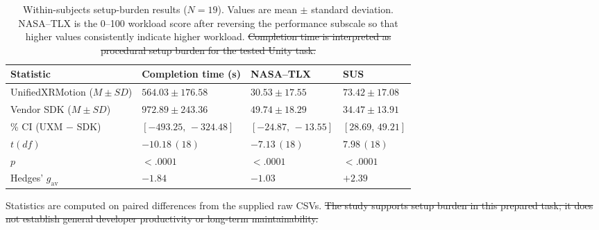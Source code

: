 \documentclass[runningheads]{llncs}
\newcommand{\rdel}[1]{\textcolor{revdel}{\sout{#1}}}
\newcommand{\rdel}[1]{}
\begin{document}
\begin{table}[t]
	\caption{Within-subjects setup-burden results ($N=19$). Values are mean $\pm$ standard deviation. NASA--TLX is the 0--100 workload score after reversing the performance subscale so that higher values consistently indicate higher workload. \protect\rdel{Completion time is interpreted as procedural setup burden for the tested Unity task.}}
	\label{tab:user-results}
	\centering
	\scriptsize
	\setlength{\tabcolsep}{3.5pt}
	\renewcommand{\arraystretch}{1.08}
	\begin{tabularx}{\textwidth}{@{}>{\raggedright\arraybackslash}X
		>{\centering\arraybackslash}p{28mm}
		>{\centering\arraybackslash}p{24mm}
		>{\centering\arraybackslash}p{23mm}@{}}
		\toprule
		Statistic & Completion time (s)   & NASA--TLX & SUS \\
		\midrule
		UnifiedXRMotion ($M\!\pm\!SD$)
		          & $564.03\!\pm\!176.58$
		          & $30.53\!\pm\!17.55$
		          & $73.42\!\pm\!17.08$                     \\
		Vendor SDK ($M\!\pm\!SD$)
		          & $972.89\!\pm\!243.36$
		          & $49.74\!\pm\!18.29$
		          & $34.47\!\pm\!13.91$                     \\
		95\% CI (UXM $-$ SDK)
		          & $[-493.25,\,-324.48]$
		          & $[-24.87,\,-13.55]$
		          & $[28.69,\,49.21]$                       \\
		$t(df)$
		          & $-10.18\,(18)$
		          & $-7.13\,(18)$
		          & $7.98\,(18)$                            \\
		$p$
		          & $<.0001$
		          & $<.0001$
		          & $<.0001$                                \\
		Hedges' $g_{\mathrm{av}}$
		          & $-1.84$
		          & $-1.03$
		          & $+2.39$                                 \\
		\bottomrule
	\end{tabularx}

	\vspace{2pt}
	{\footnotesize Statistics are computed on paired differences from the supplied raw CSVs. \rdel{The study supports setup burden in this prepared task; it does not establish general developer productivity or long-term maintainability.}\par}
\end{table}
\end{document}
